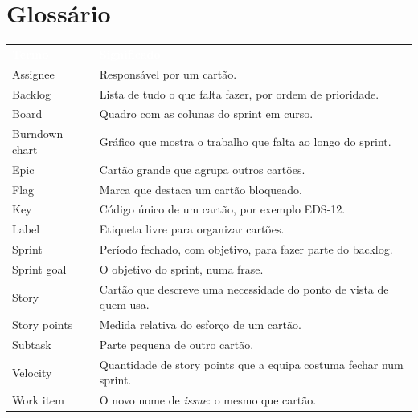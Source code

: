 \documentclass[11pt,a4paper]{article}
\newcommand{\th}[1]{\textcolor{white}{\sffamily\bfseries #1}}
\newcommand{\tabelaini}{\begingroup\small\renewcommand{\arraystretch}{1.45}\rowcolors{2}{azulclaro!55}{white}}
\newcommand{\tabelafim}{\endgroup}
\begin{document}
\section{Glossário}

\tabelaini
\begin{tabularx}{\textwidth}{N{3.4cm} Y}
   \th{Termo} & \th{Significado} \\
  Assignee & Responsável por um cartão. \\
  Backlog & Lista de tudo o que falta fazer, por ordem de prioridade. \\
  Board & Quadro com as colunas do sprint em curso. \\
  Burndown chart & Gráfico que mostra o trabalho que falta ao longo do sprint. \\
  Epic & Cartão grande que agrupa outros cartões. \\
  Flag & Marca que destaca um cartão bloqueado. \\
  Key & Código único de um cartão, por exemplo EDS-12. \\
  Label & Etiqueta livre para organizar cartões. \\
  Sprint & Período fechado, com objetivo, para fazer parte do backlog. \\
  Sprint goal & O objetivo do sprint, numa frase. \\
  Story & Cartão que descreve uma necessidade do ponto de vista de quem usa. \\
  Story points & Medida relativa do esforço de um cartão. \\
  Subtask & Parte pequena de outro cartão. \\
  Velocity & Quantidade de story points que a equipa costuma fechar num sprint. \\
  Work item & O novo nome de \textit{issue}: o mesmo que cartão. \\
  \bottomrule
\end{tabularx}
\tabelafim
\end{document}
